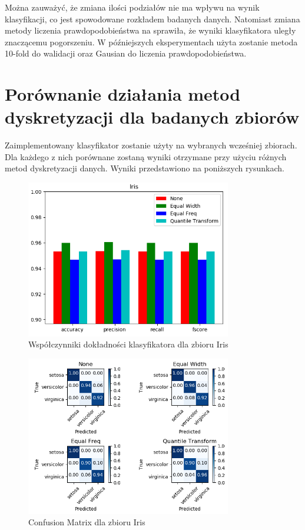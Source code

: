 \documentclass[12pt,a4paper]{article}
\begin{document}
Można zauważyć, że zmiana ilości podziałów nie ma wpływu na wynik klasyfikacji, co jest spowodowane rozkładem badanych danych. Natomiast zmiana metody liczenia prawdopodobieństwa na sprawiła, że wyniki klasyfikatora uległy znaczącemu pogorszeniu.
W późniejszych eksperymentach użyta zostanie metoda 10-fold do walidacji oraz Gausian do liczenia prawdopodobieństwa.  


\section{Porównanie działania metod dyskretyzacji dla badanych zbiorów}
Zaimplementowany klasyfikator zostanie użyty na wybranych wcześniej zbiorach. Dla każdego z nich porównane zostaną wyniki otrzymane przy użyciu różnych metod dyskretyzacji danych. Wyniki przedstawiono na poniższych rysunkach.

\begin{figure}[H]
\centering
\includegraphics[width=0.8\textwidth]{tsIris.PNG}
\caption{Współczynniki dokładności klasyfikatora dla zbioru Iris}
\end{figure}

\begin{figure}[H]
\centering
\includegraphics[width=0.8\textwidth]{tmIris.PNG}
\caption{Confusion Matrix dla zbioru Iris}
\end{figure}
\end{document}
